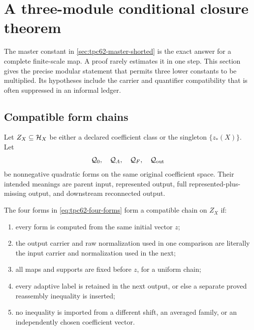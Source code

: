 \section{A three-module conditional closure theorem}
\label{sec:tpc62-conditional-closure}

The master constant in \cref{sec:tpc62-master-shorted} is the exact answer
for a complete finite-scale map.  A proof rarely estimates it in one step.
This section gives the precise modular statement that permits three lower
constants to be multiplied.  Its hypotheses include the carrier and
quantifier compatibility that is often suppressed in an informal ledger.

\subsection{Compatible form chains}

Let \(Z_X\subseteq\mathcal H_X\) be either a declared coefficient class or the
singleton \(\{z_*(X)\}\).  Let
\begin{equation}
 \mathcal Q_0,\quad \mathcal Q_A,\quad \mathcal Q_F,\quad \mathcal Q_{\rm out}
 \label{eq:tpc62-four-forms}
\end{equation}
be nonnegative quadratic forms on the same original coefficient space.
Their intended meanings are parent input, represented output, full
represented-plus-missing output, and downstream reconnected output.

\begin{definition}
\label{def:tpc62-compatible-three-module-chain}
The four forms in \eqref{eq:tpc62-four-forms} form a compatible chain on
\(Z_X\) if:
\begin{enumerate}[label=\textup{(\roman*)},leftmargin=3em]
 \item every form is computed from the same initial vector \(z\);
 \item the output carrier and raw normalization used in one comparison are
       literally the input carrier and normalization used in the next;
 \item all maps and supports are fixed before \(z\), for a uniform chain;
 \item every adaptive label is retained in the next output, or else a
       separate proved reassembly inequality is inserted;
 \item no inequality is imported from a different shift, an averaged
       family, or an independently chosen coefficient vector.
\end{enumerate}
\end{definition}

